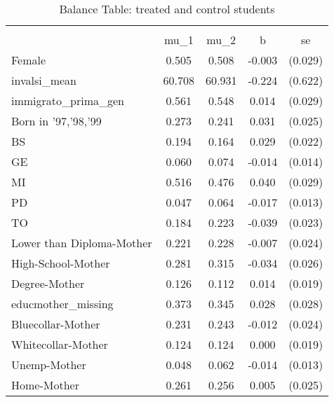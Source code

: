\begin{table}[htbp]\centering
\def\sym#1{\ifmmode^{#1}\else\(^{#1}\)\fi}
\caption{Balance Table: treated and control students}
\begin{tabular}{l*{1}{cccc}}
\hline\hline
                    &\multicolumn{4}{c}{}                                        \\
                    &        mu\_1&        mu\_2&           b         &          se\\
\hline
Female              &       0.505&       0.508&      -0.003         &     (0.029)\\
invalsi\_mean        &      60.708&      60.931&      -0.224         &     (0.622)\\
immigrato\_prima\_gen &       0.561&       0.548&       0.014         &     (0.029)\\
Born in '97,'98,'99 &       0.273&       0.241&       0.031         &     (0.025)\\
BS                  &       0.194&       0.164&       0.029         &     (0.022)\\
GE                  &       0.060&       0.074&      -0.014         &     (0.014)\\
MI                  &       0.516&       0.476&       0.040         &     (0.029)\\
PD                  &       0.047&       0.064&      -0.017         &     (0.013)\\
TO                  &       0.184&       0.223&      -0.039         &     (0.023)\\
Lower than Diploma-Mother&       0.221&       0.228&      -0.007         &     (0.024)\\
High-School-Mother  &       0.281&       0.315&      -0.034         &     (0.026)\\
Degree-Mother       &       0.126&       0.112&       0.014         &     (0.019)\\
educmother\_missing  &       0.373&       0.345&       0.028         &     (0.028)\\
Bluecollar-Mother   &       0.231&       0.243&      -0.012         &     (0.024)\\
Whitecollar-Mother  &       0.124&       0.124&       0.000         &     (0.019)\\
Unemp-Mother        &       0.048&       0.062&      -0.014         &     (0.013)\\
Home-Mother         &       0.261&       0.256&       0.005         &     (0.025)\\

\end{tabular}
\end{table}
